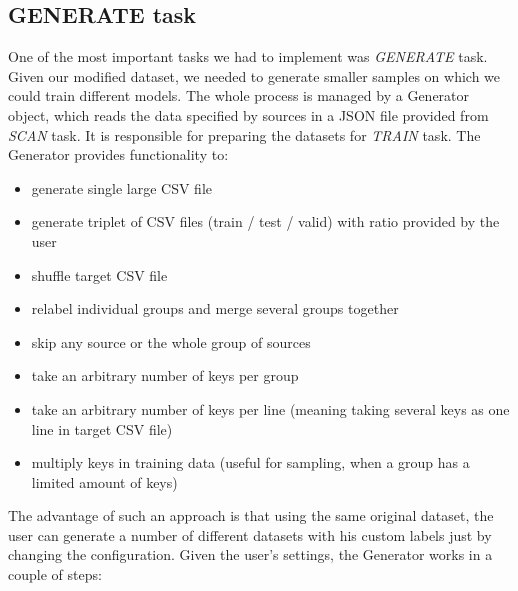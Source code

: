\subsection{GENERATE task}

One of the most important tasks we had to implement was \textit{GENERATE} task. Given our modified dataset, we needed to generate smaller samples on which we could train different models. The whole process is managed by a Generator object, which reads the data specified by sources in a JSON file provided from \textit{SCAN} task. It is responsible for preparing the datasets for \textit{TRAIN} task. The Generator provides functionality to:

\begin{itemize}

\item generate single large CSV file
\item generate triplet of CSV files (train / test / valid) with ratio provided by the user
\item shuffle target CSV file
\item relabel individual groups and merge several groups together 
\item skip any source or the whole group of sources
\item take an arbitrary number of keys per group
\item take an arbitrary number of keys per line (meaning taking several keys as one line in target CSV file)
\item multiply keys in training data (useful for sampling, when a group has a limited amount of keys)

\end{itemize}

The advantage of such an approach is that using the same original dataset, the user can generate a number of different datasets with his custom labels just by changing the configuration. Given the user's settings, the Generator works in a couple of steps:

